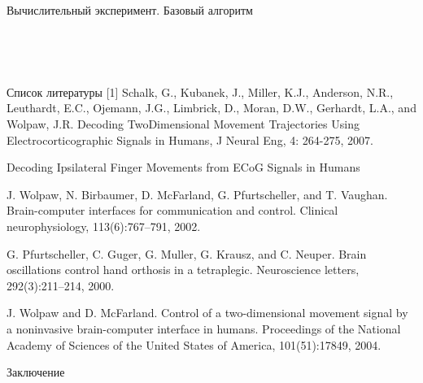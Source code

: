 \documentclass{beamer}
\begin{document}
\begin{frame}{Вычислительный эксперимент. Базовый алгоритм}
\begin{figure}[h]
    \begin{minipage}[h]{0.47\linewidth}
     \\
    \end{minipage}
    \hfill
    \begin{minipage}[h]{0.47\linewidth}
     \\
    \end{minipage}
    \vfill
\label{fg:Example}
\end{figure}
\end{frame}
\begin{frame}{Список литературы}
[1] Schalk, G., Kubanek, J., Miller, K.J., Anderson, N.R., Leuthardt, E.C., Ojemann, J.G., Limbrick, D., Moran, D.W., Gerhardt, L.A., and Wolpaw, J.R. Decoding TwoDimensional Movement Trajectories Using Electrocorticographic Signals in Humans, J Neural Eng, 4: 264-275, 2007. \par
[2] Decoding Ipsilateral Finger Movements from ECoG Signals in Humans \par
[3] J. Wolpaw, N. Birbaumer, D. McFarland, G. Pfurtscheller, and T. Vaughan. Brain-computer interfaces for communication and control. Clinical neurophysiology, 113(6):767–791, 2002. \par 
[4] G. Pfurtscheller, C. Guger, G. Muller, G. Krausz, and C. Neuper. Brain oscillations control hand orthosis in a tetraplegic. Neuroscience letters, 292(3):211–214, 2000. \par
[5] J. Wolpaw and D. McFarland. Control of a two-dimensional movement signal by a noninvasive brain-computer interface in humans. Proceedings of the National Academy of Sciences of the United States of America, 101(51):17849, 2004.
\end{frame}
\begin{frame}{Заключение}
\end{frame}
\end{document}
